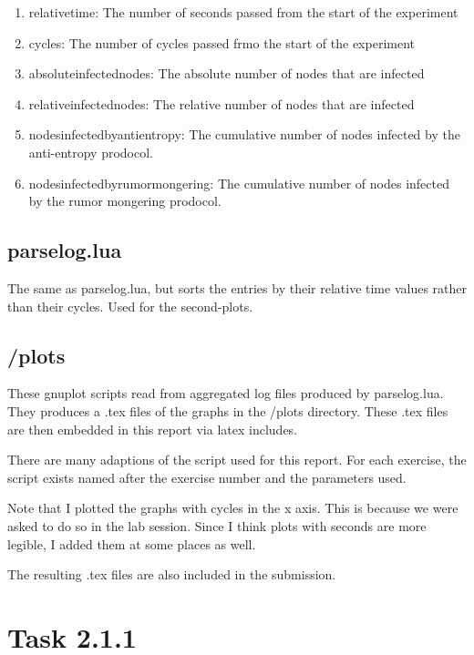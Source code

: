 \documentclass[a4paper]{article}
\begin{document}
\begin{enumerate}
\item relative\textunderscore time: The number of seconds passed from the start of the experiment
\item cycles: The number of cycles passed frmo the start of the experiment
\item absolute\textunderscore infected\textunderscore nodes: The absolute number of nodes that are infected
\item relative\textunderscore infected\textunderscore nodes: The relative number of nodes that are infected
\item nodes\textunderscore infected\textunderscore by\textunderscore anti\textunderscore entropy: The cumulative number of nodes infected by the anti-entropy prodocol.
\item nodes\textunderscore infected\textunderscore by\textunderscore rumor\textunderscore mongering: The cumulative number of nodes infected by the rumor mongering prodocol.
\end{enumerate}

\subsection{parselog.lua}

The same as parselog.lua, but sorts the entries by their relative time values rather than their cycles. Used for the second-plots.

\subsection{/plots}

These gnuplot scripts read from aggregated log files produced by parselog.lua. They produces a .tex files of the graphs in the /plots directory. These .tex files are then embedded in this report via latex includes.

There are many adaptions of the script used for this report. For each exercise, the script exists named after the exercise number and the parameters used.

Note that I plotted the graphs with cycles in the x axis. This is because we were asked to do so in the lab session. Since I think plots with seconds are more legible, I added them at some places as well.

The resulting .tex files are also included in the submission.

\section{Task 2.1.1}
\end{document}
